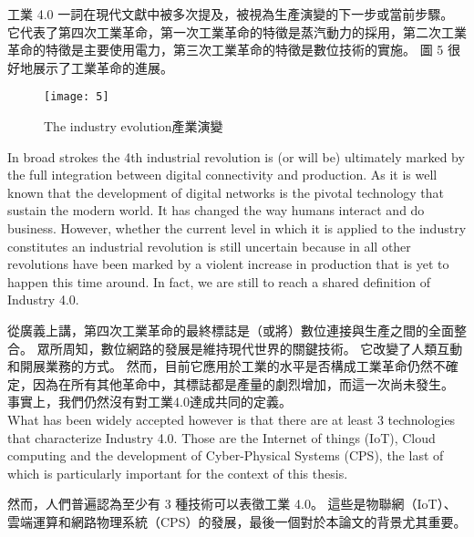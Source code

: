 \fontsize{14pt}{5pt}\sectionef
 {工業 4.0 一詞在現代文獻中被多次提及，被視為生產演變的下一步或當前步驟。 它代表了第四次工業革命，第一次工業革命的特徵是蒸汽動力的採用，第二次工業革命的特徵是主要使用電力，第三次工業革命的特徵是數位技術的實施。 圖 5 很好地展示了工業革命的進展。}\\[15pt]
\newpage
\begin{figure}[hbt!]
\begin{center}
\texttt{[image: 5]}
\caption{\large The industry evolution產業演變}\label{fig.5}
\end{center}
\end{figure}


\fontsize{14pt}{2.5pt}\sectionef 
{In broad strokes the 4th industrial revolution is (or will be) ultimately marked by the full integration between digital connectivity and production. As it is well known that the development of digital networks is the pivotal technology that sustain the modern world. It has changed the way humans interact and do business. However, whether the current level in which it is applied to the industry constitutes an industrial revolution is still uncertain because in all other revolutions have been marked by a violent increase in production that is yet to happen this time around. In fact, we are still to reach a shared definition of Industry 4.0.
}

\fontsize{14pt}{5pt}\sectionef
 {從廣義上講，第四次工業革命的最終標誌是（或將）數位連接與生產之間的全面整合。 眾所周知，數位網路的發展是維持現代世界的關鍵技術。 它改變了人類互動和開展業務的方式。 然而，目前它應用於工業的水平是否構成工業革命仍然不確定，因為在所有其他革命中，其標誌都是產量的劇烈增加，而這一次尚未發生。 事實上，我們仍然沒有對工業4.0達成共同的定義。}\\[15pt]

\fontsize{14pt}{2.5pt}\sectionef 
{What has been widely accepted however is that there are at least 3 technologies that characterize Industry 4.0. Those are the Internet of things (IoT), Cloud computing and the development of Cyber-Physical Systems (CPS), the last of which is particularly important for the context of this thesis.}

\fontsize{14pt}{5pt}\sectionef
 {然而，人們普遍認為至少有 3 種技術可以表徵工業 4.0。 這些是物聯網（IoT）、雲端運算和網路物理系統（CPS）的發展，最後一個對於本論文的背景尤其重要。}\\[15pt]

\newpage



